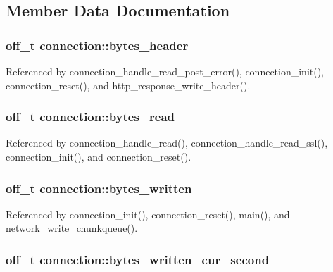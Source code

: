 \subsection{Member Data Documentation}
\hypertarget{structconnection_aa8743e91a38aa71d3fef9b0f7be115a4}{
\subsubsection[{bytes\-\_\-header}]{\setlength{\rightskip}{0pt plus 5cm}off\-\_\-t connection\-::bytes\-\_\-header}}\label{structconnection_aa8743e91a38aa71d3fef9b0f7be115a4}


Referenced by connection\-\_\-handle\-\_\-read\-\_\-post\-\_\-error(), connection\-\_\-init(), connection\-\_\-reset(), and http\-\_\-response\-\_\-write\-\_\-header().

\hypertarget{structconnection_a05f8c969aa3a06d3aed99c797c51bf88}{
\subsubsection[{bytes\-\_\-read}]{\setlength{\rightskip}{0pt plus 5cm}off\-\_\-t connection\-::bytes\-\_\-read}}\label{structconnection_a05f8c969aa3a06d3aed99c797c51bf88}


Referenced by connection\-\_\-handle\-\_\-read(), connection\-\_\-handle\-\_\-read\-\_\-ssl(), connection\-\_\-init(), and connection\-\_\-reset().

\hypertarget{structconnection_a3f55620e6831c486b00beb2df653060e}{
\subsubsection[{bytes\-\_\-written}]{\setlength{\rightskip}{0pt plus 5cm}off\-\_\-t connection\-::bytes\-\_\-written}}\label{structconnection_a3f55620e6831c486b00beb2df653060e}


Referenced by connection\-\_\-init(), connection\-\_\-reset(), main(), and network\-\_\-write\-\_\-chunkqueue().

\hypertarget{structconnection_ab08325b9e7ce8208ba2f5ab8d030543c}{
\subsubsection[{bytes\-\_\-written\-\_\-cur\-\_\-second}]{\setlength{\rightskip}{0pt plus 5cm}off\-\_\-t connection\-::bytes\-\_\-written\-\_\-cur\-\_\-second}}\label{structconnection_ab08325b9e7ce8208ba2f5ab8d030543c}


